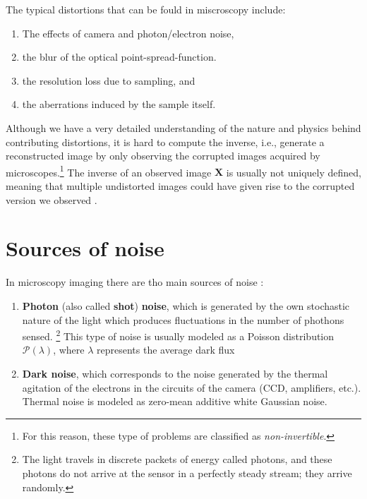 The typical distortions that can be fould in miscroscopy include:
\begin{enumerate}
  \item The
    effects of camera and photon/electron noise,
  \item the blur of the optical
    point-spread-function.
  \item the resolution loss due to sampling, and
  \item the aberrations induced by the sample itself.
\end{enumerate}
Although we have a very detailed understanding of the nature and
physics behind contributing distortions, it is hard to compute the
inverse, i.e., generate a reconstructed image by only observing the
corrupted images acquired by microscopes.\footnote{For this reason,
these type of problems are classified as \emph{non-invertible}.} The
inverse of an observed image $\mathbf{X}$ is usually not uniquely
defined, meaning that multiple undistorted images could have given
rise to the corrupted version we observed \cite{buchholz2019content}.

\section{Sources of noise}

In microscopy imaging there are tho main sources of noise
\cite{meiniel2018denoising,zhou2020wirtinger}:
\begin{enumerate}
\item \textbf{Photon} (also called \textbf{shot}) \textbf{noise},
  which is generated by the own stochastic nature of the light which
  produces fluctuations in the number of phothons
  sensed. \footnote{The light travels in discrete packets of energy
  called photons, and these photons do not arrive at the sensor in a
  perfectly steady stream; they arrive randomly.} This type of noise
  is usually modeled as a Poisson distribution $\mathcal{P}(\lambda)$,
  where $\lambda$ represents the average dark flux
\item \textbf{Dark noise}, which corresponds to the noise generated by
  the thermal agitation of the electrons in the circuits of the camera
  (CCD, amplifiers, etc.). Thermal noise is modeled as zero-mean
  additive white Gaussian noise.
\end{enumerate}


